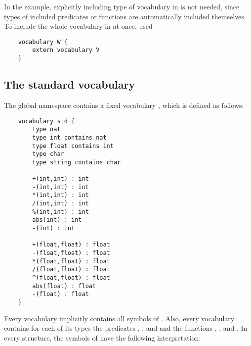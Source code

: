 \documentclass[a4]{article}
\begin{document}
In the example, explicitly including type  of vocabulary  in  is not needed, since types of included predicates or functions are automatically included themselves.  To include the whole vocabulary  in  at once, used
\begin{lstlisting}
	vocabulary W {
		extern vocabulary V
	}
\end{lstlisting}




\subsection{The standard vocabulary}

The global namespace contains a fixed vocabulary , which is defined as follows:

\begin{lstlisting}
	vocabulary std {
		type nat	
		type int contains nat
		type float contains int
		type char
		type string contains char

		+(int,int) : int
		-(int,int) : int
		*(int,int) : int
		/(int,int) : int
		%(int,int) : int
		abs(int) : int
		-(int) : int
		
		+(float,float) : float
		-(float,float) : float
		*(float,float) : float
		/(float,float) : float
		^(float,float) : float
		abs(float) : float
		-(float) : float
	}
\end{lstlisting}
Every vocabulary implicitly contains all symbols of .  Also, every vocabulary contains for each of its types  the predicates , , and  and the functions , ,  and . In every structure, the symbols of  have the following interpretation:
\end{document}
